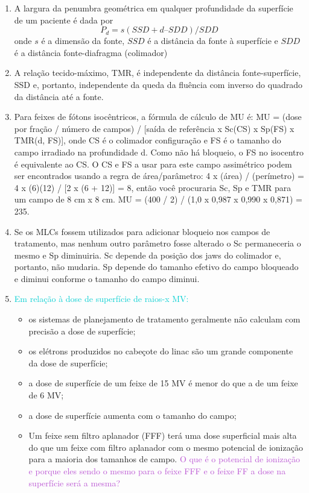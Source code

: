 \documentclass[11pt,a4paper]{article}
\begin{document}
\begin{enumerate}
        \item A largura da penumbra geométrica em qualquer profundidade da superfície de um paciente é dada por$$ P_d = s (SSD + d – SDD) / SDD$$ onde $s$ é a dimensão da fonte, $SSD$ é a distância da fonte à superfície e $SDD$ é a distância fonte-diafragma (colimador)

        \item A relação tecido-máximo, TMR, é independente da distância fonte-superfície, SSD e, portanto, independente da queda da fluência com inverso do quadrado da distância até a fonte.

        \item Para feixes de fótons isocêntricos, a fórmula de cálculo de MU é: MU = (dose por fração / número de campos) / [saída de referência x Sc(CS) x Sp(FS) x TMR(d, FS)], onde CS é o colimador configuração e FS é o tamanho do campo irradiado na profundidade d. Como não há bloqueio, o FS no isocentro é equivalente ao CS. O CS e FS a usar para este campo assimétrico podem ser encontrados usando a regra de área/parâmetro: 4 x (área) / (perímetro) = 4 x (6)(12) / [2 x (6 + 12)] = 8, então você procuraria Sc, Sp e TMR para um campo de 8 cm x 8 cm. MU = (400 / 2) / (1,0 x 0,987 x 0,990 x 0,871) = 235.
        
        \item Se os MLCs fossem utilizados para adicionar bloqueio nos campos de tratamento, mas nenhum outro parâmetro fosse alterado o Sc permaneceria o mesmo e Sp diminuiria. Sc depende da posição dos jaws do colimador e, portanto, não mudaria. Sp depende do tamanho efetivo do campo bloqueado e diminui conforme o tamanho do campo diminui.

        \item \textcolor{DarkTurquoise}{Em relação à dose de superfície de raios-x MV:}
            \begin{itemize}[label=\textcolor{CarnationPink}{$\star$}]
                \item os sistemas de planejamento de tratamento geralmente não calculam com precisão a dose de superfície;
                \item os elétrons produzidos no cabeçote do linac são um grande componente da dose de superfície;
                \item a dose de superfície de um feixe de 15 MV é menor do que a de um feixe de 6 MV;
                \item a dose de superfície aumenta com o tamanho do campo;
                \item Um feixe sem filtro aplanador (FFF) terá uma dose superficial mais alta do que um feixe com filtro aplanador com o mesmo potencial de ionização para a maioria dos tamanhos de campo. \textcolor{MediumOrchid}{O que é o potencial de ionização e porque eles sendo o mesmo para o feixe FFF e o feixe FF a dose na superfície será a mesma?}
            \end{itemize}


\end{enumerate}
\end{document}
